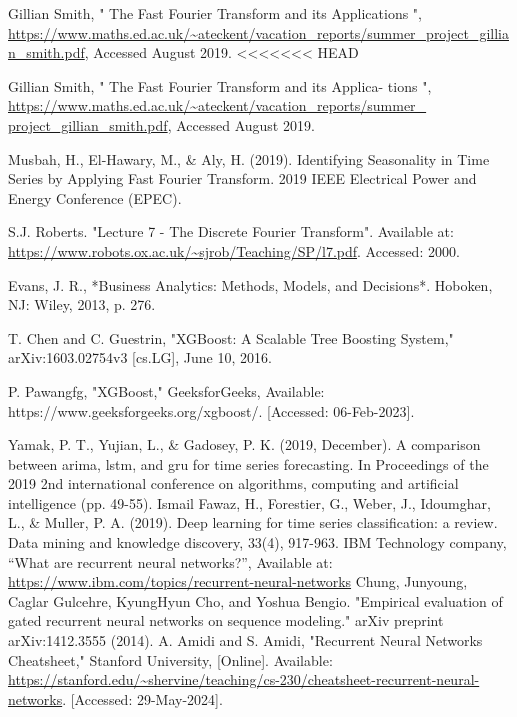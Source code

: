 \documentclass{ieeeojies}
\begin{document}
\begin{thebibliography}{00}
Gillian Smith, " The Fast Fourier Transform and its Applications ", \url{https://www.maths.ed.ac.uk/~ateckent/vacation_reports/summer_project_gillian_smith.pdf}, Accessed August 2019. 
<<<<<<< HEAD


Gillian Smith, " The Fast Fourier Transform and its Applica-
tions ",\url{ https://www.maths.ed.ac.uk/~ateckent/vacation_reports/summer_ project_gillian_smith.pdf}, Accessed August 2019.

Musbah, H., El-Hawary, M., \& Aly, H. (2019). Identifying Seasonality in
Time Series by Applying Fast Fourier Transform. 2019 IEEE Electrical
Power and Energy Conference (EPEC).

S.J. Roberts. "Lecture 7 - The Discrete Fourier Transform". Available at:
\url{https://www.robots.ox.ac.uk/~sjrob/Teaching/SP/l7.pdf}. Accessed: 2000.

Evans, J. R., *Business Analytics: Methods, Models, and Decisions*. Hoboken, NJ: Wiley, 2013, p. 276.

T. Chen and C. Guestrin, "XGBoost: A Scalable Tree Boosting System," arXiv:1603.02754v3 [cs.LG], June 10, 2016.

P. Pawangfg, "XGBoost," GeeksforGeeks, Available: https://www.geeksforgeeks.org/xgboost/. [Accessed: 06-Feb-2023].

Yamak, P. T., Yujian, L., \& Gadosey, P. K. (2019, December). A comparison between arima, lstm, and gru for time series forecasting. In Proceedings of the 2019 2nd international conference on algorithms, computing and artificial intelligence (pp. 49-55).
Ismail Fawaz, H., Forestier, G., Weber, J., Idoumghar, L., \& Muller, P. A. (2019). Deep learning for time series classification: a review. Data mining and knowledge discovery, 33(4), 917-963.
IBM Technology company, “What are recurrent neural networks?”, Available at: \url{https://www.ibm.com/topics/recurrent-neural-networks}
Chung, Junyoung, Caglar Gulcehre, KyungHyun Cho, and Yoshua Bengio. "Empirical evaluation of gated recurrent neural networks on sequence modeling." arXiv preprint arXiv:1412.3555 (2014).
A. Amidi and S. Amidi, "Recurrent Neural Networks Cheatsheet," Stanford University, [Online]. Available: \url{https://stanford.edu/~shervine/teaching/cs-230/cheatsheet-recurrent-neural-networks}. [Accessed: 29-May-2024]. 


\end{thebibliography}
\end{document}
